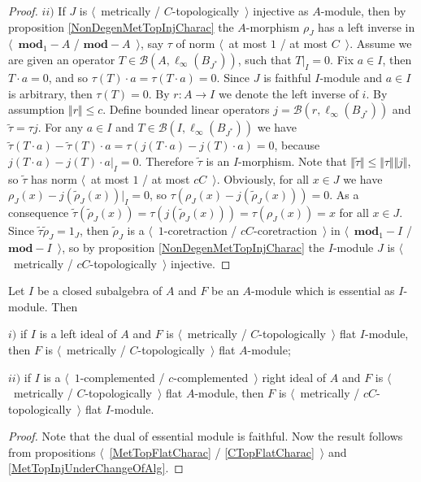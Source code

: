 \begin{proof}
$ii)$ If $J$ is $\langle$~metrically / $C$-topologically~$\rangle$ injective as $A$-module, then by proposition \ref{NonDegenMetTopInjCharac} the $A$-morphism $\rho_J$ has a left inverse in $\langle$~$\mathbf{mod}_1-A$ / $\mathbf{mod}-A$~$\rangle$, say $\tau $ of norm $\langle$~at most $1$ / at most $C$~$\rangle$. Assume we are given an operator $T\in \mathcal{B}(A,\ell_\infty(B_{J^*}))$, such that $T|_I=0$. Fix $a\in I$, then $T\cdot a=0$, and so $\tau (T)\cdot a=\tau (T\cdot a)=0$. Since $J$ is faithful $I$-module and $a\in I$ is arbitrary, then $\tau (T)=0$. By $r:A\to I$  we denote the left inverse of $i$. By assumption $\Vert r\Vert\leq c$. Define bounded linear operators $j=\mathcal{B}(r,\ell_\infty(B_{J^*}))$ and $\widetilde{\tau}=\tau  j$. For any $a\in I$ and $T\in\mathcal{B}(I,\ell_\infty(B_{J^*}))$ we have $\widetilde{\tau}(T\cdot a)-\widetilde{\tau}(T)\cdot a=\tau (j(T\cdot a)-j(T)\cdot a)=0$, because $j(T\cdot a)-j(T)\cdot a|_I=0$. Therefore $\widetilde{\tau}$ is an $I$-morphism. Note that $\Vert\widetilde{\tau}\Vert\leq\Vert\tau \Vert\Vert j\Vert$, so $\widetilde{\tau}$ has norm $\langle$~at most $1$ / at most $cC$~$\rangle$. Obviously, for all $x\in J$ we have $\rho_J(x)-j(\widetilde{\rho}_J(x))|_I=0$, so $\tau (\rho_J(x)-j(\widetilde{\rho}_J(x)))=0$. As a consequence $\widetilde{\tau}(\widetilde{\rho}_J(x))=\tau (j(\widetilde{\rho}_J(x)))=\tau (\rho_J(x))=x$ for all $x\in J$. Since $\widetilde{\tau}\widetilde{\rho}_J=1_J$, then $\widetilde{\rho}_J$ is a  $\langle$~$1$-coretraction / $cC$-coretraction~$\rangle$ in $\langle$~$\mathbf{mod}_1-I$ / $\mathbf{mod}-I$~$\rangle$, so by proposition \ref{NonDegenMetTopInjCharac} the $I$-module $J$ is $\langle$~metrically / $cC$-topologically~$\rangle$ injective.
\end{proof}


\begin{proposition}\label{MetTopFlatUnderChangeOfAlg} Let $I$ be a closed subalgebra of $A$ and $F$ be an $A$-module which is essential as $I$-module. Then

$i)$ if $I$ is a left ideal of $A$ and $F$ is $\langle$~metrically / $C$-topologically~$\rangle$  flat $I$-module, then $F$ is $\langle$~metrically / $C$-topologically~$\rangle$ flat $A$-module;

$ii)$ if $I$ is a $\langle$~$1$-complemented / $c$-complemented~$\rangle$ right ideal of $A$ and $F$ is $\langle$~metrically / $C$-topologically~$\rangle$ flat $A$-module, then $F$ is $\langle$~metrically / $cC$-topologically~$\rangle$ flat $I$-module.
\end{proposition}
\begin{proof} Note that the dual of essential module is faithful. Now the result follows from propositions $\langle$~\ref{MetTopFlatCharac} / \ref{CTopFlatCharac}~$\rangle$ and \ref{MetTopInjUnderChangeOfAlg}.
\end{proof}	

